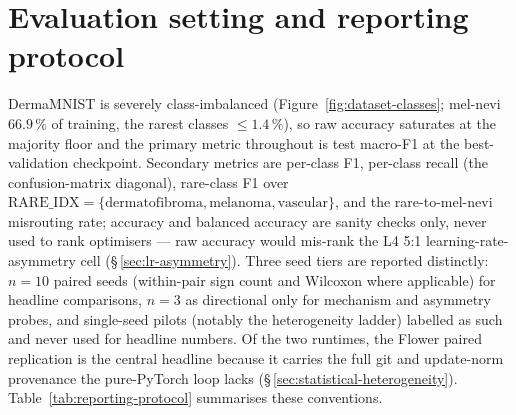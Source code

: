 \documentclass[11pt,a4paper]{report}
\begin{document}

\section{Evaluation setting and reporting protocol}
\label{sec:eval-setting}

DermaMNIST is severely class-imbalanced (Figure~\ref{fig:dataset-classes};
mel-nevi $66.9\,\%$ of training, the rarest classes $\leq 1.4\,\%$), so raw
accuracy saturates at the majority floor and the primary metric throughout is
test macro-F1 at the best-validation checkpoint. Secondary metrics are per-class
F1, per-class recall (the confusion-matrix diagonal), rare-class F1 over
$\mathrm{RARE\_IDX} = \{\text{dermatofibroma}, \text{melanoma},
\text{vascular}\}$, and the rare-to-mel-nevi misrouting rate; accuracy and
balanced accuracy are sanity checks only, never used to rank optimisers --- raw
accuracy would mis-rank the L4 5:1 learning-rate-asymmetry cell
(\S\,\ref{sec:lr-asymmetry}). Three seed tiers are reported distinctly:
$n = 10$ paired seeds (within-pair sign count and Wilcoxon where applicable) for
headline comparisons, $n = 3$ as directional only for mechanism and asymmetry
probes, and single-seed pilots (notably the heterogeneity ladder) labelled as
such and never used for headline numbers. Of the two runtimes, the Flower paired
replication is the central headline because it carries the full git and
update-norm provenance the pure-PyTorch loop lacks
(\S\,\ref{sec:statistical-heterogeneity}). Table~\ref{tab:reporting-protocol}
summarises these conventions.


\end{document}
